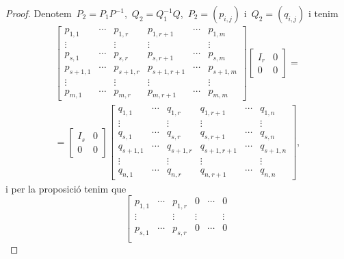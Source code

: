 \documentclass[../../main.tex]{subfiles}
\begin{document}
\begin{proof}
        Denotem~\(P_{2}=P_{1}P^{-1}\),~\(Q_{2}=Q_{1}^{-1}Q\),~\(P_{2}=(p_{i,j})\) i~\(Q_{2}=(q_{i,j})\) i tenim
        \begin{multline*}
        \left[\begin{array}{ccc|ccc}
        p_{1,1} & \cdots & p_{1,r} & p_{1,r+1} & \cdots & p_{1,m} \\
        \vdots & & \vdots & \vdots & & \vdots \\
        p_{s,1} & \cdots & p_{s,r} & p_{s,r+1} & \cdots & p_{s,m} \\\hline
        p_{s+1,1} & \cdots & p_{s+1,r} & p_{s+1,r+1} & \cdots & p_{s+1,m} \\
        \vdots & & \vdots & \vdots & & \vdots \\
        p_{m,1} & \cdots & p_{m,r} & p_{m,r+1} & \cdots & p_{m,m}
        \end{array}\right]
        \left[\begin{array}{c|c}
        I_{r} & 0\\\hline
        0 & 0
        \end{array}\right]=\\=
        \left[\begin{array}{c|c}
        I_{s} & 0\\\hline
        0 & 0
        \end{array}\right]
        \left[\begin{array}{ccc|ccc}
        q_{1,1} & \cdots & q_{1,r} & q_{1,r+1} & \cdots & q_{1,n} \\
        \vdots & & \vdots & \vdots & & \vdots \\
        q_{s,1} & \cdots & q_{s,r} & q_{s,r+1} & \cdots & q_{s,n} \\\hline
        q_{s+1,1} & \cdots & q_{s+1,r} & q_{s+1,r+1} & \cdots & q_{s+1,n} \\
        \vdots & & \vdots & \vdots & & \vdots \\
        q_{n,1} & \cdots & q_{n,r} & q_{n,r+1} & \cdots & q_{n,n}
        \end{array}\right],
        \end{multline*}
        i per la proposició  tenim que
        \[\left[\begin{array}{cccccc}
        p_{1,1} & \cdots & p_{1,r} & 0 & \cdots & 0 \\
        \vdots & & \vdots & \vdots & & \vdots \\
        p_{s,1} & \cdots & p_{s,r} & 0 & \cdots & 0 \\

\end{array}\]
\end{proof}
\end{document}
